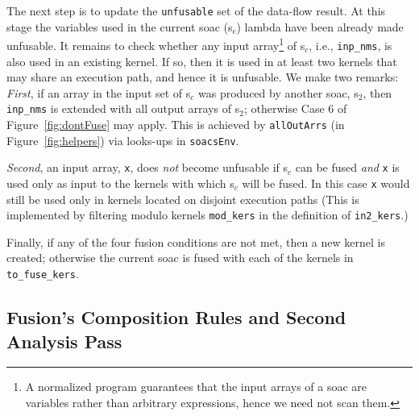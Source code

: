 \documentclass{sigplanconf}  %
\newcommand{\emp}[1]{\textcolor{DikuRed}{ #1}}
\begin{document}
The next step is to update the {\tt unfusable} set of the data-flow result.
At this stage the variables used in the current {\sc soac} ({\sc s}$_c$) lambda
have been already made unfusable. It remains to check whether any input
array\footnote{
A normalized program guarantees that the input arrays of a {\sc soac}
are variables rather than arbitrary expressions, hence we need not scan them.
} of {\sc s}$_c$, i.e., {\tt inp\_nms}, is also used in an 
existing kernel. If so, then it is used in at least two kernels that may
share an execution path, and hence it is unfusable. We make two remarks:
{\em First}, if an array in the input set of {\sc s}$_c$
was produced by another {\sc soac}, {\sc s}$_2$, then {\tt inp\_nms} is
extended with all output arrays of {\sc s}$_2$; otherwise \emp{Case 6} 
of Figure~\ref{fig:dontFuse} may apply. This is achieved by
{\tt allOutArrs} (in Figure~\ref{fig:helpers}) 
via looks-ups in {\tt soacsEnv}. 

{\em Second}, an input array, {\tt x}, does {\em not} become unfusable if
{\sc s}$_c$ can be fused {\em and} {\tt x} is used only as input 
to the kernels with which {\sc s}$_c$ will be fused. In this case {\tt x}
would still be used only in kernels located on disjoint execution paths
(This is implemented by filtering modulo kernels 
{\tt mod\_kers} in the  definition of {\tt in2\_kers}.)

Finally, if any of the four fusion conditions are not met, 
then a new kernel is created; otherwise the current {\sc soac}
is fused with each of the kernels in {\tt to\_fuse\_kers}.


\subsection{Fusion's Composition Rules and Second Analysis Pass}
\label{sec:CompRules}
\end{document}
